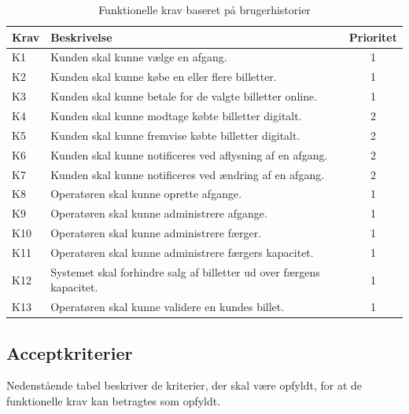 \documentclass[a4paper, 11pt]{article}
\begin{document}
\begin{table}[ht]
\centering
\begin{tabular}{|l|p{9cm}|c|}
\hline
\textbf{Krav} & \textbf{Beskrivelse} & \textbf{Prioritet} \\
\hline
K1 & Kunden skal kunne vælge en afgang. & 1 \\
\hline
K2 & Kunden skal kunne købe en eller flere billetter. & 1 \\
\hline
K3 & Kunden skal kunne betale for de valgte billetter online. & 1 \\
\hline
K4 & Kunden skal kunne modtage købte billetter digitalt. & 2 \\
\hline
K5 & Kunden skal kunne fremvise købte billetter digitalt. & 2 \\
\hline
K6 & Kunden skal kunne notificeres ved aflysning af en afgang. & 2 \\
\hline
K7 & Kunden skal kunne notificeres ved ændring af en afgang. & 2 \\
\hline
K8 & Operatøren skal kunne oprette afgange. & 1 \\
\hline
K9 & Operatøren skal kunne administrere afgange. & 1 \\
\hline
K10 & Operatøren skal kunne administrere færger. & 1 \\
\hline
K11 & Operatøren skal kunne administrere færgers kapacitet. & 1 \\
\hline
K12 & Systemet skal forhindre salg af billetter ud over færgens kapacitet. & 1 \\
\hline
K13 & Operatøren skal kunne validere en kundes billet. & 1 \\
\hline
\end{tabular}
\caption{Funktionelle krav baseret på brugerhistorier}
\label{tab:krav}
\end{table}

\newpage

\subsection{Acceptkriterier}

Nedenstående tabel beskriver de kriterier, der skal være opfyldt, for at de funktionelle
krav kan betragtes som opfyldt.
\end{document}
